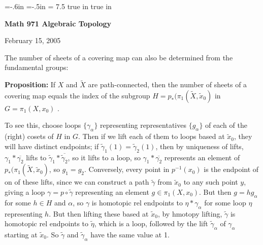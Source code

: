 
\overfullrule=0pt
\parindent=0pt

\nopagenumbers



\voffset=-.6in
\hoffset=-.5in
\hsize = 7.5 true in
 true in




\loadmsbm



\def\ctln{\centerline}
\def\u{\underbar}
\def\ssk{\smallskip}
\def\msk{\medskip}
\def\bsk{\bigskip}
\def\hsk{\hskip.1in}
\def\hhsk{\hskip.2in}
\def\dsl{\displaystyle}
\def\hskp{\hskip1.5in}

\def\lra{$\Leftrightarrow$ }
\def\ra{\rightarrow}
\def\mpto{\logmapsto}
\def\pu{\pi_1}
\def\mpu{$\pi_1$}
\def\sig{\Sigma}
\def\msig{$\Sigma$}
\def\ep{\epsilon}
\def\sset{\subseteq}
\def\del{\partial}
\def\inv{^{-1}}
\def\wtl{\widetilde}



\ctln{\bf Math 971 Algebraic Topology}

\ssk

\ctln{February 15, 2005}

\msk

The number of sheets of a covering map can also be determined 
from the fundamental groups:

\msk

{\bf Proposition:} If $X$ and $\wtl{X}$ are 
path-connected, then the number of sheets of a covering map equals
the index of the subgroup $H=p_*(\pu(\wtl{X},\wtl{x}_0)$ in 
$G=\pu(X,x_0)$ . 

\msk

To see this, choose loops $\{\gamma_\alpha\}$ representing representatives $\{g_\alpha\}$ of each of the (right) cosets of $H$ in $G$. Then if we lift
each of them to loops based at $\wtl{x}_0$, they will have distinct
endpoints; if $\wtl{\gamma}_1(1)=\wtl{\gamma}_2(1)$, then 
by uniqueness of lifts, $\gamma_1*\overline{\gamma_2}$ lifts to 
$\wtl{\gamma}_1*\overline{\wtl{\gamma}_2}$, so it
lifts to a loop, so $\gamma_1*\overline{\gamma_2}$ represents
an element of $p_*(\pu(\wtl{X},\wtl{x}_0)$, so $g_1=g_2$.
Conversely, every point in $p\inv(x_0)$ is the endpoint of on of these
lifts, since we can construct a path $\wtl{\gamma}$
from $\wtl{x}_0$ to any such point $y$, giving a loop
$\gamma=p\circ \wtl{\gamma}$ representing an element $g\in\pu(X,x_0)$.
But then $g=hg_\alpha$ for some $h\in H$ and $\alpha$, 
so $\gamma$ is homotopic rel endpoints to $\eta*\gamma_\alpha$ for some loop
$\eta$ representing $h$. But then lifting these based at $\wtl{x}_0$, by hmotopy
lifting, $\wtl{\gamma}$ is homotopic rel endpoints to $\wtl{\eta}$, which is a 
loop, followed by the lift $\wtl{\gamma}_\alpha$ of $\gamma_\alpha$
starting at $\wtl{x}_0$. So $\wtl{\gamma}$ and 
$\wtl{\gamma}_\alpha$ have the same value at 1.

